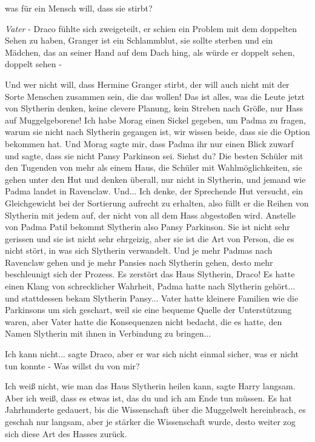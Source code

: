 \glqq{}was für ein Mensch will, dass sie stirbt?\grqq{}

\emph{Vater} - Draco fühlte sich zweigeteilt, er schien ein Problem mit dem
doppelten Sehen zu haben, Granger ist ein Schlammblut, sie sollte sterben und
ein Mädchen, das an seiner Hand auf dem Dach hing, als würde er doppelt sehen,
doppelt sehen -

\glqq{}Und wer nicht will, dass Hermine Granger stirbt, der will auch nicht mit
der Sorte Menschen zusammen sein, die das wollen! Das ist alles, was die Leute
jetzt von Slytherin denken, keine clevere Planung, kein Streben nach Größe, nur
Hass auf Muggelgeborene! Ich habe Morag einen Sickel gegeben, um Padma zu
fragen, warum sie nicht nach Slytherin gegangen ist, wir wissen beide, dass sie
die Option bekommen hat. Und Morag sagte mir, dass Padma ihr nur einen Blick
zuwarf und sagte, dass sie nicht Pansy Parkinson sei. Siehst du? Die besten
Schüler mit den Tugenden von mehr als einem Haus, die Schüler mit
Wahlmöglichkeiten, sie gehen unter den Hut und denken überall, nur nicht in
Slytherin, und jemand wie Padma landet in Ravenclaw. Und... Ich denke, der
Sprechende Hut versucht, ein Gleichgewicht bei der Sortierung aufrecht zu
erhalten, also füllt er die Reihen von Slytherin mit jedem auf, der nicht von
all dem Hass abgestoßen wird. Anstelle von Padma Patil bekommt Slytherin also
Pansy Parkinson. Sie ist nicht sehr gerissen und sie ist nicht sehr ehrgeizig,
aber sie ist die Art von Person, die es nicht stört, in was sich Slytherin
verwandelt. Und je mehr Padmas nach Ravenclaw gehen und je mehr Pansies nach
Slytherin gehen, desto mehr beschleunigt sich der Prozess. Es zerstört das Haus
Slytherin, Draco!\grqq{} Es hatte einen Klang von schrecklicher Wahrheit, Padma
hatte nach Slytherin gehört... und stattdessen bekam Slytherin Pansy... Vater
hatte kleinere Familien wie die Parkinsons um sich geschart, weil sie eine
bequeme Quelle der Unterstützung waren, aber Vater hatte die Konsequenzen nicht
bedacht, die es hatte, den Namen Slytherin mit ihnen in Verbindung zu bringen...

\glqq{}Ich kann nicht...\grqq{} sagte Draco, aber er war sich nicht einmal
sicher, was er nicht tun konnte - \glqq{}Was willst du von mir?\grqq{}

\glqq{}Ich weiß nicht, wie man das Haus Slytherin heilen kann\grqq{}, sagte Harry
langsam. \glqq{}Aber ich weiß, dass es etwas ist, das du und ich am Ende tun
müssen. Es hat Jahrhunderte gedauert, bis die Wissenschaft über die Muggelwelt
hereinbrach, es geschah nur langsam, aber je stärker die Wissenschaft wurde,
desto weiter zog sich diese Art des Hasses zurück.\grqq{}

